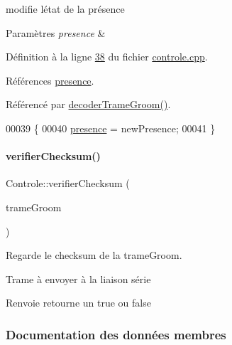 modifie l\textquotesingle{}état de la présence 


\begin{DoxyParams}{Paramètres}
{\em presence} & \\
\hline
\end{DoxyParams}


Définition à la ligne \hyperlink{controle_8cpp_source_l00038}{38} du fichier \hyperlink{controle_8cpp_source}{controle.\+cpp}.



Références \hyperlink{controle_8h_source_l00071}{presence}.



Référencé par \hyperlink{controle_8cpp_source_l00049}{decoder\+Trame\+Groom()}.


\begin{DoxyCode}
00039 \{
00040     \hyperlink{class_controle_a089f74f48f24f09e7fc51b03a5ede79e}{presence} = newPresence;
00041 \}
\end{DoxyCode}
\mbox{\label{class_controle_a4f40023a18e4e656282a15d5657e0a25}} 
\paragraph{\texorpdfstring{verifier\+Checksum()}{verifierChecksum()}}
{\footnotesize\ttfamily Controle\+::verifier\+Checksum (\begin{DoxyParamCaption}\item[{Q\+String}]{trame\+Groom }\end{DoxyParamCaption})\hspace{0.3cm}{\ttfamily [private]}}



Regarde le checksum de la trame\+Groom. 

Trame à envoyer à la liaison série \begin{DoxyReturn}{Renvoie}
retourne un true ou false 
\end{DoxyReturn}


\subsubsection{Documentation des données membres}
\mbox{\label{class_controle_a5d818564000173732472eb9ac20e53aa}} 
